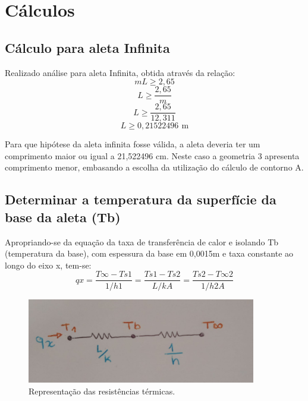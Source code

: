 \chapter{Cálculos}\label{cap:calculus}

\section{Cálculo para aleta Infinita}\label{sec:infity}

Realizado análise para aleta Infinita, obtida através da relação:\\
\begin{equation}
    {m}{L}\geq{2,65}
\end{equation}
\begin{equation}
    {L}\geq{\frac{2,65}{m}}
\end{equation}
\begin{equation}
    {L}\geq{\frac{2,65}{12,311 }}
\end{equation}
\begin{equation}
    {L}\geq{0,21522496\,\SI{}{\meter}}
\end{equation}
\par Para que hipótese da aleta infinita fosse válida, a aleta deveria ter um
comprimento maior ou igual a 21,522496 cm.
Neste caso a geometria 3 apresenta comprimento menor, embasando a
escolha da utilização do cálculo de contorno A.

\section{Determinar a temperatura da superfície da base da aleta (Tb)}\label{sec:prob1}
Apropriando-se da equação da taxa de transferência de calor e isolando Tb (temperatura da base), com espessura da base em 0,0015m e taxa constante ao longo do eixo x, tem-se:
\begin{equation}
    {qx}={\frac{T\infty-Ts1}{1/{h1}}}={\frac{Ts1-Ts2}{L/{{k}{A}}}}={\frac{Ts2-T\infty2}{1/{h2}{A}}}
\end{equation}

\begin{figure}[h]
    \centering
    \caption{Representação das resistências térmicas.}
    \label{fig:res}
    \includegraphics[width=10cm]{figuras/resistenciasTermicas.jpeg}
    \fonteproprioautor
\end{figure}

